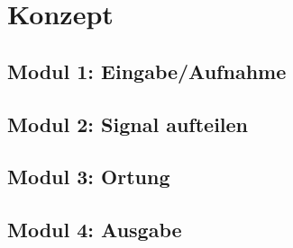 \section{Konzept} 
      \subsection{Modul 1: Eingabe/Aufnahme}
      \subsection{Modul 2: Signal aufteilen}
      \subsection{Modul 3: Ortung}
      \subsection{Modul 4: Ausgabe}
